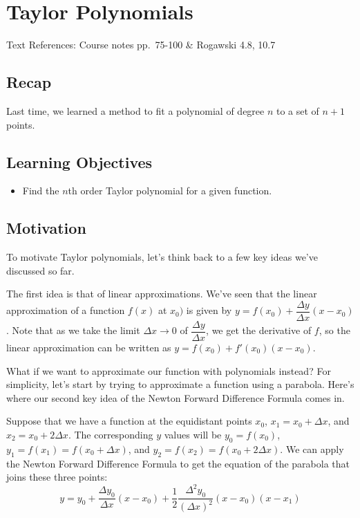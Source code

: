 \documentclass[
]{book}
\providecommand{\tightlist}{%
  \setlength{\itemsep}{0pt}\setlength{\parskip}{0pt}}
\theoremstyle{definition}
\theoremstyle{definition}
\theoremstyle{definition}
\theoremstyle{definition}
\theoremstyle{remark}
\begin{document}
\hypertarget{lec-20}{%
\chapter{Taylor Polynomials}\label{lec-20}}

Text References: Course notes pp.~75-100 \& Rogawski 4.8, 10.7

\hypertarget{recap-18}{%
\section{Recap}\label{recap-18}}

Last time, we learned a method to fit a polynomial of degree \(n\) to a set of \(n+1\) points.

\hypertarget{learning-objectives-19}{%
\section{Learning Objectives}\label{learning-objectives-19}}

\begin{itemize}
\tightlist
\item
  Find the \(n\)th order Taylor polynomial for a given function.
\end{itemize}

\hypertarget{motivation}{%
\section{Motivation}\label{motivation}}

To motivate Taylor polynomials, let's think back to a few key ideas we've discussed so far.

The first idea is that of linear approximations. We've seen that the linear approximation of a function \(f(x)\) at \(x_0)\) is given by \(y=f(x_0)+\dfrac{\Delta y}{\Delta x}(x-x_0)\). Note that as we take the limit \(\Delta x \to 0\) of \(\dfrac{\Delta y}{\Delta x}\), we get the derivative of \(f\), so the linear approximation can be written as \(y=f(x_0)+f'(x_0)(x-x_0)\).

What if we want to approximate our function with polynomials instead? For simplicity, let's start by trying to approximate a function using a parabola. Here's where our second key idea of the Newton Forward Difference Formula comes in.

Suppose that we have a function at the equidistant points \(x_0\), \(x_1=x_0+\Delta x\), and \(x_2 = x_0 +2 \Delta x\). The corresponding \(y\) values will be \(y_0=f(x_0)\), \(y_1 = f(x_1)=f(x_0+\Delta x)\), and \(y_2=f(x_2)=f(x_0+2\Delta x)\). We can apply the Newton Forward Difference Formula to get the equation of the parabola that joins these three points: \[y=y_0+\frac{\Delta y_0}{\Delta x}(x-x_0)+ \frac{1}{2}\frac{\Delta^2 y_0}{(\Delta x)^2}(x-x_0)(x-x_1)\]
\end{document}
